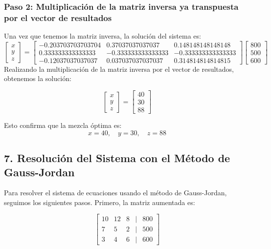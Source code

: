\documentclass[]{article}
\begin{document}
	\subsubsection*{Paso 2: Multiplicación de la matriz inversa ya transpuesta por el vector de resultados}
	Una vez que tenemos la matriz inversa, la solución del sistema es:
	\[
	\begin{bmatrix}
		x \\
		y \\
		z
	\end{bmatrix}
	=
	\begin{bmatrix}
		-0.203703703703704 & 0.37037037037037 & 0.148148148148148 \\
		0.333333333333333 & -0.333333333333333 & -0.333333333333333 \\
		-0.12037037037037 & 0.037037037037037 & 0.314814814814815
	\end{bmatrix}
	\begin{bmatrix}
		800 \\
		500 \\
		600
	\end{bmatrix}
	\]
	Realizando la multiplicación de la matriz inversa por el vector de resultados, obtenemos la solución:
	
	\[
	\begin{bmatrix}
		x \\
		y \\
		z
	\end{bmatrix}
	=
	\begin{bmatrix}
		40 \\
		30 \\
		88
	\end{bmatrix}
	\]
	
	Esto confirma que la mezcla óptima es:
	\[
	x = 40, \quad y = 30, \quad z = 88
	\]
	
	\subsection*{7. Resolución del Sistema con el Método de Gauss-Jordan}
	Para resolver el sistema de ecuaciones usando el método de Gauss-Jordan, seguimos los siguientes pasos. Primero, la matriz aumentada es:
	
	\[
	\begin{bmatrix}
		10 & 12 & 8 & | & 800 \\
		7 & 5 & 2 & | & 500 \\
		3 & 4 & 6 & | & 600
	\end{bmatrix}
	\]
	
\end{document}
